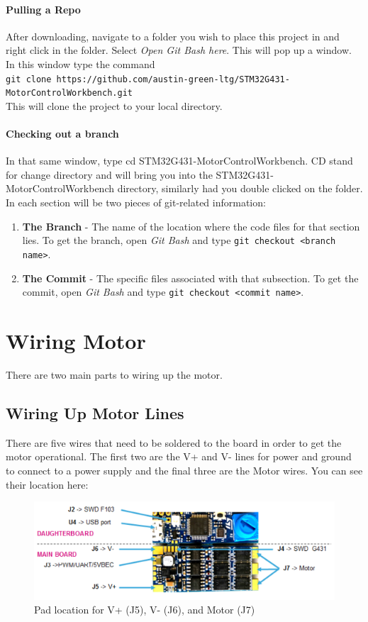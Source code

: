 \documentclass[10pt]{article}
\begin{document}
				\paragraph{Pulling a Repo}
                    After downloading, navigate to a folder you wish to place this project in and right click in the folder. Select \emph{Open Git Bash here}. This will pop up a window. In this window type the command \\ 
                    \texttt{git clone https://github.com/austin-green-ltg/STM32G431-MotorControlWorkbench.git} \\ 
                    This will clone the project to your local directory.
				\paragraph{Checking out a branch}
                    In that same window, type cd STM32G431-MotorControlWorkbench. CD stand for change directory and will bring you into the STM32G431-MotorControlWorkbench directory, similarly had you double clicked on the folder. In each section will be two pieces of git-related information:
                    \begin{enumerate}
                        \item \textbf{The Branch} - The name of the location where the code files for that section lies. To get the branch, open \emph{Git Bash} and type \texttt{git checkout <branch name>}.
                        \item \textbf{The Commit} - The specific files associated with that subsection. To get the commit, open \emph{Git Bash} and type \texttt{git checkout <commit name>}.
                    \end{enumerate}
	\FloatBarrier \section{Wiring Motor}
        There are two main parts to wiring up the motor.
		\FloatBarrier \subsection{Wiring Up Motor Lines}
            There are five wires that need to be soldered to the board in order to get the motor operational. The first two are the V+ and V- lines for power and ground to connect to a power supply and the final three are the Motor wires. You can see their location here: 
			\begin{figure}[H]
				\centerline{\includegraphics[width=\textwidth]{References/Power Wiring.png}}
				\caption{Pad location for V+ (J5), V- (J6), and Motor (J7)}
			\end{figure}
\end{document}
